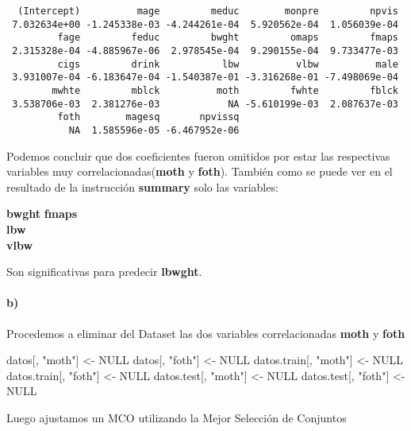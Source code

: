 \documentclass[]{article}
\newenvironment{Shaded}{\begin{snugshade}}{\end{snugshade}}
\newcommand{\StringTok}[1]{\textcolor[rgb]{0.31,0.60,0.02}{#1}}
\newcommand{\OtherTok}[1]{\textcolor[rgb]{0.56,0.35,0.01}{#1}}
\newcommand{\NormalTok}[1]{#1}
\let\oldparagraph\paragraph
\renewcommand{\paragraph}[1]{\oldparagraph{#1}\mbox{}}
\begin{document}
\begin{verbatim}
  (Intercept)          mage         meduc        monpre         npvis 
 7.032634e+00 -1.245338e-03 -4.244261e-04  5.920562e-04  1.056039e-04 
         fage         feduc         bwght         omaps         fmaps 
 2.315328e-04 -4.885967e-06  2.978545e-04  9.290155e-04  9.733477e-03 
         cigs         drink           lbw          vlbw          male 
 3.931007e-04 -6.183647e-04 -1.540387e-01 -3.316268e-01 -7.498069e-04 
        mwhte         mblck          moth         fwhte         fblck 
 3.538706e-03  2.381276e-03            NA -5.610199e-03  2.087637e-03 
         foth        magesq       npvissq 
           NA  1.585596e-05 -6.467952e-06 
\end{verbatim}

Podemos concluir que dos coeficientes fueron omitidos por estar las
respectivas variables muy correlacionadas(\textbf{moth} y
\textbf{foth}). También como se puede ver en el resultado de la
instrucción \textbf{summary} solo las variables:

\textbf{bwght} \textbf{fmaps}\\
\textbf{lbw}\\
\textbf{vlbw}

Son significativas para predecir \textbf{lbwght}.

\paragraph{b)}\label{b}

Procedemos a eliminar del Dataset las dos variables correlacionadas
\textbf{moth} y \textbf{foth}

\begin{Shaded}
\begin{Highlighting}[]
\NormalTok{datos[, }\StringTok{"moth"}\NormalTok{] <-}\StringTok{ }\OtherTok{NULL}
\NormalTok{datos[, }\StringTok{"foth"}\NormalTok{] <-}\StringTok{ }\OtherTok{NULL}
\NormalTok{datos.train[, }\StringTok{"moth"}\NormalTok{] <-}\StringTok{ }\OtherTok{NULL}
\NormalTok{datos.train[, }\StringTok{"foth"}\NormalTok{] <-}\StringTok{ }\OtherTok{NULL}
\NormalTok{datos.test[, }\StringTok{"moth"}\NormalTok{] <-}\StringTok{ }\OtherTok{NULL}
\NormalTok{datos.test[, }\StringTok{"foth"}\NormalTok{] <-}\StringTok{ }\OtherTok{NULL}
\end{Highlighting}
\end{Shaded}

Luego ajustamos un MCO utilizando la Mejor Selección de Conjuntos
\end{document}

